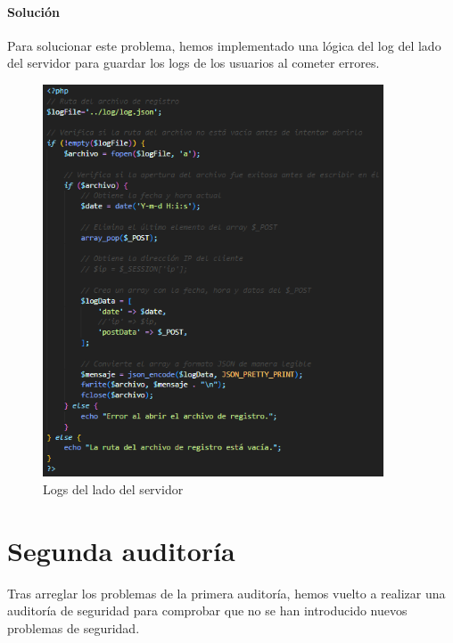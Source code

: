 \documentclass{report}
\begin{document}
                \subsubsection{Solución}
                    Para solucionar este problema, hemos implementado una lógica del log del lado del servidor para guardar los logs de los usuarios al cometer errores.
                    \begin{figure}[H]
                        \centering
                        \includegraphics[width=0.9\textwidth]{./img/vulnerabilidades/3.9/2.2.png}
                        \caption{Logs del lado del servidor}
                    \end{figure}
            \clearpage
    \chapter{Segunda auditoría}
        Tras arreglar los problemas de la primera auditoría, hemos vuelto a realizar una auditoría de seguridad para comprobar que no se han introducido nuevos problemas de seguridad.
\end{document}

